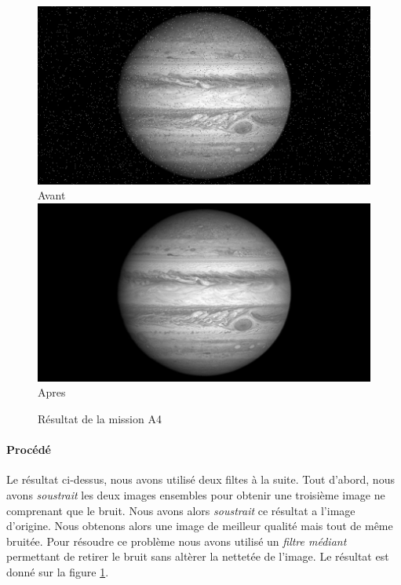 \documentclass{article}
\begin{document}
\begin{figure}[h]
\centering
	\begin{multicols}{2}
	\includegraphics[scale=0.325]{img/Jupiter.png}
	Avant
	\includegraphics[scale=0.325]{img/JupiterAp.png}
	Apres
	\end{multicols}
	\vspace{-0.9cm}
	\caption{Résultat de la mission A4}
	\label{A4}
\end{figure}

\paragraph{Procédé}

Le résultat ci-dessus, nous avons utilisé deux filtes à la suite. Tout d'abord, nous avons \emph{soustrait} les deux images ensembles pour obtenir une troisième image ne comprenant que le bruit. Nous avons alors \emph{soustrait} ce résultat a l'image d'origine. Nous obtenons alors une image de meilleur qualité mais tout de même bruitée. Pour résoudre ce problème nous avons utilisé un \emph{filtre médiant} permettant de retirer le bruit sans altèrer la nettetée de l'image. Le résultat est donné sur la figure \ref{A4}.
\end{document}
